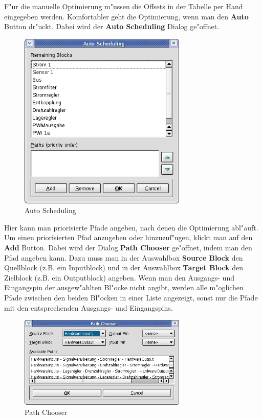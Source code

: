 \documentclass[a4paper,titlepage,12pt,ngerman]{scrbook}
\begin{document}
F"ur die manuelle Optimierung m"ussen die Offsets in der Tabelle per Hand eingegeben werden. Komfortabler geht die Optimierung, wenn man den {\bf Auto} Button dr"uckt. Dabei wird der {\bf Auto Scheduling} Dialog ge"offnet.
\begin{figure}[htbp]

\begin{center}

\includegraphics[width=8cm]{AutoScheduling}

\caption{Auto Scheduling}\label{test}

\end{center}
\end{figure}
Hier kann man priorisierte Pfade angeben, nach denen die Optimierung abl"auft. Um einen priorisierten Pfad anzugeben oder hinzuzuf"ugen, klickt man auf den {\bf Add} Button. Dabei wird der Dialog {\bf Path Chooser} ge"offnet, indem man den Pfad angeben kann. Dazu muss man in der Auswahlbox {\bf Source Block} den Quellblock (z.B. ein Inputblock) und in der Auswahlbox {\bf Target Block} den Zielblock (z.B. ein Outputblock) angeben. Wenn man den Ausgangs- und Eingangspin der ausgew"ahlten Bl"ocke nicht angibt, werden alle m"oglichen Pfade zwischen den beiden Bl"ocken in einer Liste angezeigt, sonst nur die Pfade mit den entsprechenden Ausgangs- und Eingangspins.
\begin{figure}[htbp]

\begin{center}

\includegraphics[width=8cm]{SchedulingPathChooser}

\caption{Path Chooser}\label{test}

\end{center}
\end{figure}
\end{document}
